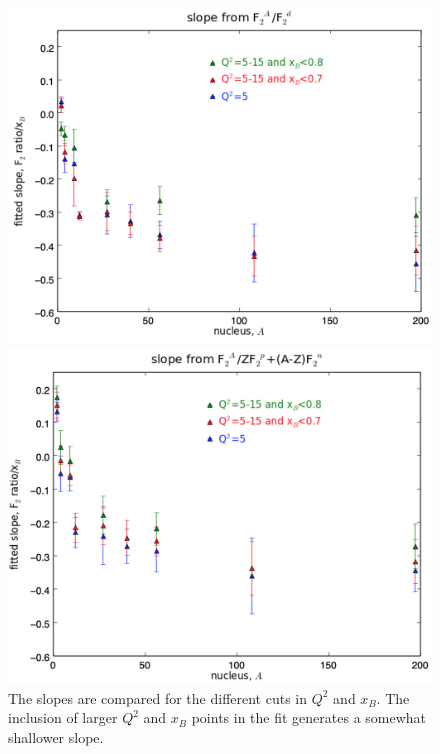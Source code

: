 \documentclass[oneside]{article}
\begin{document}
\begin{figure}[H]
\begin{minipage}{0.5\textwidth}
 \includegraphics[width=\textwidth]{plots/plotsvA/Aslope_ad.png}
\end{minipage}\hfill\begin{minipage}{0.5\textwidth}
\includegraphics[width=\textwidth]{plots/plotsvA/Aslope_free.png}
\end{minipage}
  \caption[]{The slopes are compared for the different cuts in $Q^2$ and $x_B$. The inclusion of larger $Q^2$ and $x_B$ points in the fit generates a somewhat shallower slope.}
  \label{fig:Aslope_compare}
\end{figure}   
\end{document}
